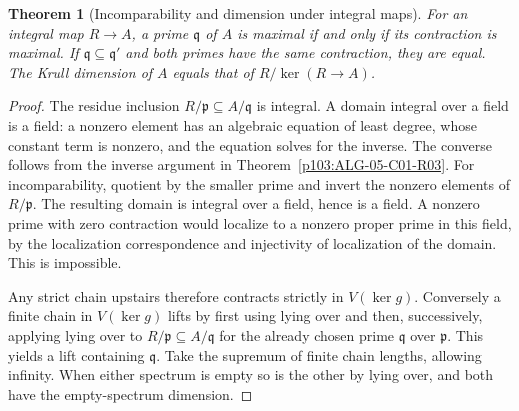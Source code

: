 \documentclass[11pt,oneside,openany]{book}
\newtheorem{theorem}{Theorem}[chapter]
\theoremstyle{definition}
\theoremstyle{remark}
\begin{document}
\begin{theorem}[Incomparability and dimension under integral maps]\label{p103:ALG-05-C01-S04}
For an integral map \(R\to A\), a prime \(\mathfrak q\) of \(A\) is maximal if and only if its contraction is maximal. If \(\mathfrak q\subseteq\mathfrak q'\) and both primes have the same contraction, they are equal. The Krull dimension of \(A\) equals that of \(R/\ker(R\to A)\).
\end{theorem}
\begin{proof}
The residue inclusion \(R/\mathfrak p\subseteq A/\mathfrak q\) is integral. A domain integral over a field is a field: a nonzero element has an algebraic equation of least degree, whose constant term is nonzero, and the equation solves for the inverse. The converse follows from the inverse argument in Theorem~\ref{p103:ALG-05-C01-R03}. For incomparability, quotient by the smaller prime and invert the nonzero elements of \(R/\mathfrak p\). The resulting domain is integral over a field, hence is a field. A nonzero prime with zero contraction would localize to a nonzero proper prime in this field, by the localization correspondence and injectivity of localization of the domain. This is impossible.

Any strict chain upstairs therefore contracts strictly in \(V(\ker g)\). Conversely a finite chain in \(V(\ker g)\) lifts by first using lying over and then, successively, applying lying over to \(R/\mathfrak p\subseteq A/\mathfrak q\) for the already chosen prime \(\mathfrak q\) over \(\mathfrak p\). This yields a lift containing \(\mathfrak q\). Take the supremum of finite chain lengths, allowing infinity. When either spectrum is empty so is the other by lying over, and both have the empty-spectrum dimension.
\end{proof}
\end{document}
